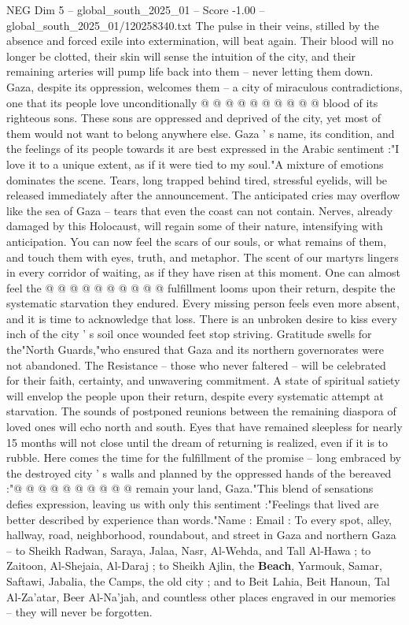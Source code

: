 \begin{textsample}{NEG Dim 5 – global\_south\_2025\_01 – Score -1.00 – global\_south\_2025\_01/120258340.txt}
The pulse in their veins, stilled by the absence and forced exile into extermination, will beat again.
Their blood will no longer be clotted, their skin will sense the intuition of the city, and their remaining arteries will pump life back into them -- never letting them down.
Gaza, despite its oppression, welcomes them -- a city of miraculous contradictions, one that its people love unconditionally @ @ @ @ @ @ @ @ @ @ blood of its righteous sons.
These sons are oppressed and deprived of the city, yet most of them would not want to belong anywhere else.
Gaza ' s name, its condition, and the feelings of its people towards it are best expressed in the Arabic sentiment :"I love it to a unique extent, as if it were tied to my soul."A mixture of emotions dominates the scene.
Tears, long trapped behind tired, stressful eyelids, will be released immediately after the announcement.
The anticipated cries may overflow like the sea of Gaza -- tears that even the coast can not contain.
Nerves, already damaged by this Holocaust, will regain some of their nature, intensifying with anticipation.
You can now feel the scars of our souls, or what remains of them, and touch them with eyes, truth, and metaphor.
The scent of our martyrs lingers in every corridor of waiting, as if they have risen at this moment.
One can almost feel the @ @ @ @ @ @ @ @ @ @ fulfillment looms upon their return, despite the systematic starvation they endured.
Every missing person feels even more absent, and it is time to acknowledge that loss.
There is an unbroken desire to kiss every inch of the city ' s soil once wounded feet stop striving.
Gratitude swells for the"North Guards,"who ensured that Gaza and its northern governorates were not abandoned.
The Resistance -- those who never faltered -- will be celebrated for their faith, certainty, and unwavering commitment.
A state of spiritual satiety will envelop the people upon their return, despite every systematic attempt at starvation.
The sounds of postponed reunions between the remaining diaspora of loved ones will echo north and south.
Eyes that have remained sleepless for nearly 15 months will not close until the dream of returning is realized, even if it is to rubble.
Here comes the time for the fulfillment of the promise -- long embraced by the destroyed city ' s walls and planned by the oppressed hands of the bereaved :"@ @ @ @ @ @ @ @ @ @ remain your land, Gaza."This blend of sensations defies expression, leaving us with only this sentiment :"Feelings that lived are better described by experience than words."Name : Email : To every spot, alley, hallway, road, neighborhood, roundabout, and street in Gaza and northern Gaza -- to Sheikh Radwan, Saraya, Jalaa, Nasr, Al-Wehda, and Tall Al-Hawa ; to Zaitoon, Al-Shejaia, Al-Daraj ; to Sheikh Ajlin, the \textbf{Beach}, Yarmouk, Samar, Saftawi, Jabalia, the Camps, the old city ; and to Beit Lahia, Beit Hanoun, Tal Al-Za'atar, Beer Al-Na'jah, and countless other places engraved in our memories -- they will never be forgotten.

\end{textsample}
